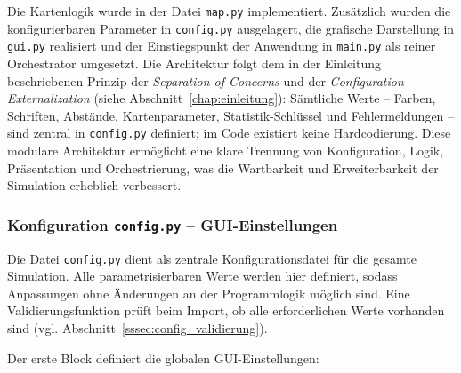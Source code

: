 Die Kartenlogik wurde in der Datei \texttt{map.py} implementiert. Zusätzlich wurden die konfigurierbaren Parameter in \texttt{config.py} ausgelagert, die grafische Darstellung in \texttt{gui.py} realisiert und der Einstiegspunkt der Anwendung in \texttt{main.py} als reiner Orchestrator umgesetzt. Die Architektur folgt dem in der Einleitung beschriebenen Prinzip der \textit{Separation of Concerns} und der \textit{Configuration Externalization} (siehe Abschnitt~\ref{chap:einleitung}): Sämtliche Werte – Farben, Schriften, Abstände, Kartenparameter, Statistik-Schlüssel und Fehlermeldungen – sind zentral in \texttt{config.py} definiert; im Code existiert keine Hardcodierung. Diese modulare Architektur ermöglicht eine klare Trennung von Konfiguration, Logik, Präsentation und Orchestrierung, was die Wartbarkeit und Erweiterbarkeit der Simulation erheblich verbessert.


\subsubsection{Konfiguration \texttt{config.py} – \acs{GUI}-Einstellungen}

Die Datei \texttt{config.py} dient als zentrale Konfigurationsdatei für die gesamte Simulation. Alle parametrisierbaren Werte werden hier definiert, sodass Anpassungen ohne Änderungen an der Programmlogik möglich sind. Eine Validierungsfunktion prüft beim Import, ob alle erforderlichen Werte vorhanden sind (vgl. Abschnitt~\ref{sssec:config_validierung}).

Der erste Block definiert die globalen \acs{GUI}-Einstellungen:




